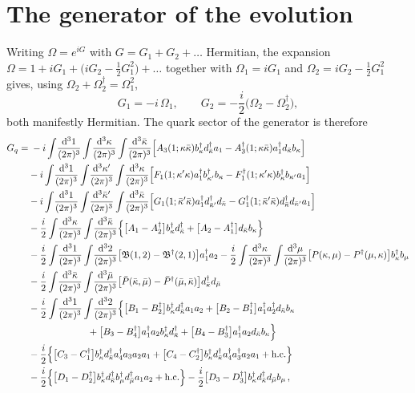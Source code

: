 \documentclass[11pt]{article}
\newcommand{\dd}{\mathrm{d}}
\newcommand{\ip}[1]{\int\!\frac{\dd^3 #1}{(2\pi)^3}}
\newcommand{\he}{\mathrm{h.c.}}
\newcommand{\dg}{\dagger}
\newcommand{\OM}{\Omega}
\begin{document}
\section{The generator of the evolution}
\label{sec:gen}

Writing $\OM=e^{iG}$ with $G=G_1+G_2+\dots$ Hermitian, the expansion
$\OM=1+iG_1+\big(iG_2-\tfrac12G_1^2\big)+\dots$ together with $\OM_1=iG_1$ and
$\OM_2=iG_2-\tfrac12 G_1^2$ gives, using $\OM_2+\OM_2^\dg=\OM_1^2$,
\begin{equation}
G_1=-i\,\OM_1,\qquad G_2=-\frac{i}{2}\big(\OM_2-\OM_2^\dg\big),
\end{equation}
both manifestly Hermitian. The quark sector of the generator is therefore
\begin{align}
G_q=&\;-i\ip{1}\ip{\kappa}\ip{\bar\kappa}
\Big[A_3(1;\kappa\bar\kappa)b^\dg_\kappa d^\dg_{\bar\kappa}a_1-A_3^\dg(1;\kappa\bar\kappa)a^\dg_1d_{\bar\kappa}b_\kappa\Big]
\nonumber\\
&-i\ip{1}\ip{\kappa'}\ip{\kappa}\Big[F_1(1;\kappa'\kappa)a^\dg_1b^\dg_{\kappa'}b_\kappa
-F_1^\dg(1;\kappa'\kappa)b^\dg_\kappa b_{\kappa'}a_1\Big]
\nonumber\\
&-i\ip{1}\ip{\bar\kappa'}\ip{\bar\kappa}\Big[G_1(1;\bar\kappa'\bar\kappa)a^\dg_1d^\dg_{\bar\kappa'}d_{\bar\kappa}
-G_1^\dg(1;\bar\kappa'\bar\kappa)d^\dg_{\bar\kappa}d_{\bar\kappa'}a_1\Big]
\nonumber\\
&-\frac{i}{2}\ip{\kappa}\ip{\bar\kappa}\Big\{\big[A_1-A_2^\dg\big]b^\dg_\kappa d^\dg_{\bar\kappa}
+\big[A_2-A_1^\dg\big]d_{\bar\kappa}b_\kappa\Big\}
\nonumber\\
&-\frac{i}{2}\ip{1}\ip{2}\big[\mathfrak B(1,2)-\mathfrak B^\dg(2,1)\big]a^\dg_1a_2
-\frac{i}{2}\ip{\kappa}\ip{\mu}\big[P(\kappa,\mu)-P^\dg(\mu,\kappa)\big]b^\dg_\kappa b_\mu
\nonumber\\
&-\frac{i}{2}\ip{\bar\kappa}\ip{\bar\mu}\big[\bar P(\bar\kappa,\bar\mu)-\bar P^\dg(\bar\mu,\bar\kappa)\big]
d^\dg_{\bar\kappa}d_{\bar\mu}
\nonumber\\
&-\frac{i}{2}\ip{1}\ip{2}\Big\{\big[B_1-B_2^\dg\big]b^\dg_\kappa d^\dg_{\bar\kappa}a_1a_2
+\big[B_2-B_1^\dg\big]a^\dg_1a^\dg_2 d_{\bar\kappa}b_\kappa
\nonumber\\
&\hspace{2.2cm}
+\big[B_3-B_4^\dg\big]a^\dg_1a_2b^\dg_\kappa d^\dg_{\bar\kappa}
+\big[B_4-B_3^\dg\big]a^\dg_1a_2d_{\bar\kappa}b_\kappa\Big\}
\nonumber\\
&-\frac{i}{2}\Big\{\big[C_3-C_1^\dg\big]b^\dg_\kappa d^\dg_{\bar\kappa}a^\dg_4a_3a_2a_1
+\big[C_4-C_2^\dg\big]b^\dg_\kappa d^\dg_{\bar\kappa}a^\dg_4a^\dg_3a_2a_1+\he\Big\}
\nonumber\\
&-\frac{i}{2}\Big\{\big[D_1-D_2^\dg\big]b^\dg_\kappa d^\dg_{\bar\kappa}b^\dg_\mu d^\dg_{\bar\mu}a_1a_2+\he\Big\}
-\frac{i}{2}\big[D_3-D_3^\dg\big]b^\dg_\kappa d^\dg_{\bar\kappa}d_{\bar\mu}b_\mu\,,
\label{eq:G}
\end{align}
\end{document}

